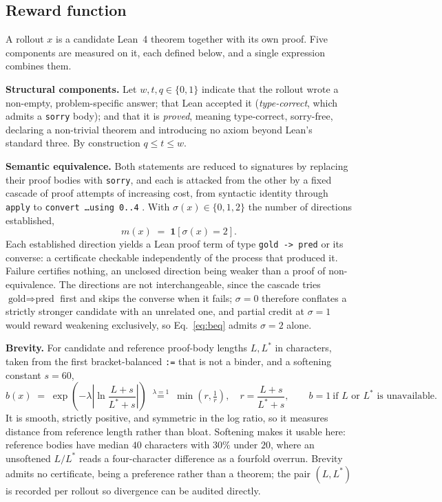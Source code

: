 \subsection{Reward function}
\label{sec:reward}

A rollout $x$ is a candidate Lean~4 theorem together with its own proof. Five
components are measured on it, each defined below, and a single expression
combines them.

\textbf{Structural components.} Let $w,t,q\in\{0,1\}$ indicate that the rollout
wrote a non-empty, problem-specific answer; that Lean accepted it
(\emph{type-correct}, which admits a \texttt{sorry} body); and that it is
\emph{proved}, meaning type-correct, sorry-free, declaring a non-trivial theorem
and introducing no axiom beyond Lean's standard three. By construction
$q \le t \le w$.

\textbf{Semantic equivalence.} Both statements are reduced to signatures by
replacing their proof bodies with \texttt{sorry}, and each is attacked from the
other by a fixed cascade of proof attempts of increasing cost, from syntactic
identity through \texttt{apply} to \texttt{convert \ldots using 0..4}
\citep{poiroux2025reliable}. With $\sigma(x)\in\{0,1,2\}$ the number of
directions established,
%
\begin{equation}
\label{eq:beq}
m(x) \;=\; \mathbf{1}\!\left[\sigma(x) = 2\right] .
\end{equation}
%
Each established direction yields a Lean proof term of type
\verb|gold -> pred| or its converse: a certificate checkable independently of
the process that produced it. Failure certifies nothing, an unclosed direction
being weaker than a proof of non-equivalence. The directions are not
interchangeable, since the cascade tries $\text{gold}\Rightarrow\text{pred}$
first and skips the converse when it fails; $\sigma=0$ therefore conflates a
strictly stronger candidate with an unrelated one, and partial credit at
$\sigma=1$ would reward weakening exclusively, so Eq.~\ref{eq:beq} admits
$\sigma=2$ alone.

\textbf{Brevity.} For candidate and reference proof-body lengths $L,L^{*}$ in
characters, taken from the first bracket-balanced \verb|:=| that is not a
binder, and a softening constant $s=60$,
%
\begin{equation}
\label{eq:brevity}
b(x) \;=\; \exp\!\left(-\lambda\left|\ln\frac{L+s}{L^{*}+s}\right|\right)
\;\overset{\lambda=1}{=}\; \min\!\left(r,\tfrac{1}{r}\right),
\quad r=\frac{L+s}{L^{*}+s},
\qquad b=1 \ \text{if $L$ or $L^{*}$ is unavailable} .
\end{equation}
%
It is smooth, strictly positive, and symmetric in the log ratio, so it measures
distance from reference length rather than bloat. Softening makes it usable
here: reference bodies have median $40$ characters with $30\%$ under $20$, where
an unsoftened $L/L^{*}$ reads a four-character difference as a fourfold overrun.
Brevity admits no certificate, being a preference rather than a theorem; the
pair $(L,L^{*})$ is recorded per rollout so divergence can be audited directly.

